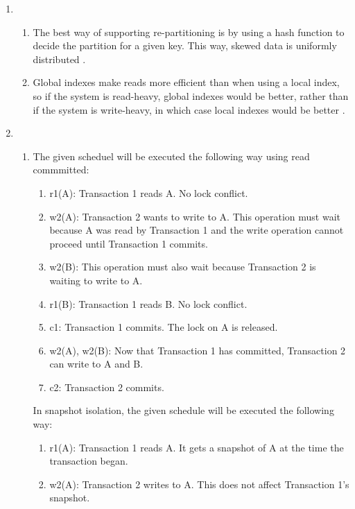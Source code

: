 \begin{enumerate}
\begin{enumerate}
                \autocite[p.~159]{kleppmann_2017}.
        \end{enumerate}
    \item 
    \begin{enumerate}
        \item The best way of supporting re-partitioning is by using a hash
            function to decide the partition for a given key. This way,
            skewed data is uniformly distributed 
            \autocite[pp.~201-205]{kleppmann_2017}.
        \item Global indexes make reads more efficient than when using a local
            index, so if the system is read-heavy, global indexes would be
            better, rather than if the system is write-heavy, in which case
            local indexes would be better \autocite[p.~208]{kleppmann_2017}.
    \end{enumerate}
    \item 
    \begin{enumerate}
        \item The given scheduel will be executed the following way using 
            read commmitted:
            \begin{enumerate}
                \item r1(A): Transaction 1 reads A. No lock conflict.
                \item w2(A): Transaction 2 wants to write to A. This operation must wait because A was read by Transaction 1 and the write operation cannot proceed until Transaction 1 commits.
                \item w2(B): This operation must also wait because Transaction 2 is waiting to write to A.
                \item r1(B): Transaction 1 reads B. No lock conflict.
                \item c1: Transaction 1 commits. The lock on A is released.
                \item w2(A), w2(B): Now that Transaction 1 has committed, Transaction 2 can write to A and B.
                \item c2: Transaction 2 commits.
            \end{enumerate}
            In snapshot isolation, the given schedule will be executed the
            following way:
            \begin{enumerate}
                \item r1(A): Transaction 1 reads A. It gets a snapshot of A at the time the transaction began.
                \item w2(A): Transaction 2 writes to A. This does not affect Transaction 1's snapshot.

\end{enumerate}
\end{enumerate}
\end{enumerate}
